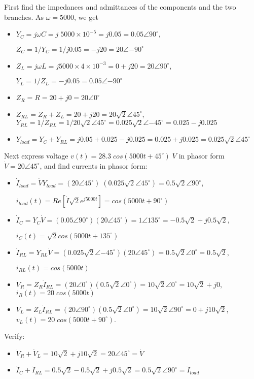 First find the impedances and admittances of the components and the two
branches. As $\omega=5000$, we get
\begin{itemize}
\item $Y_C=j\omega C=j\;5000\times 10^{-5}=j0.05=0.05\angle{90^\circ}$,

	$Z_C=1/Y_C=1/j0.05=-j20=20\angle{-90^\circ}$
\item $Z_L=j\omega L=j5000\times 4\times 10^{-3}=0+j20=20\angle{90^\circ}$,

	$Y_L=1/Z_L=-j0.05=0.05\angle{-90^\circ}$
\item $Z_R=R=20+j0=20\angle{0^\circ}$

\item $Z_{RL}=Z_R+Z_L=20+j20=20\sqrt{2}\angle{45^\circ}$,
	$Y_{RL}=1/Z_{RL}=1/20\sqrt{2}\angle{45^\circ}
	=0.025\sqrt{2}\angle{-45^\circ}=0.025-j0.025$

\item $Y_{load}=Y_C+Y_{RL}=j0.05+0.025-j0.025=0.025+j0.025
	=0.025\sqrt{2}\angle{45^\circ}$
\end{itemize}
Next express voltage $v(t)=28.3\;cos(5000t+45^\circ)\;V$ in phasor form
$\dot{V}=20\angle{45^\circ}$, and find currents in phasor form:
\begin{itemize}
\item $\dot{I}_{load}=\dot{V}Y_{load}=(20\angle{45^\circ})\;
	(0.025\sqrt{2}\angle{45^\circ})=0.5\sqrt{2}\angle{90^\circ}$,

	$i_{load}(t)=Re[\dot{I}\sqrt{2}e^{j5000t}]=cos(5000t+90^\circ)$
\item $\dot{I}_C=Y_C\dot{V}=(0.05\angle{90^\circ})(20\angle{45^\circ})
	=1\angle{135^\circ}=-0.5\sqrt{2}+j0.5\sqrt{2}$,

	$i_C(t)=\sqrt{2}cos(5000t+135^\circ)$
\item $\dot{I}_{RL}=Y_{RL}\dot{V}=(0.025\sqrt{2}\angle{-45^\circ})(20\angle{45^\circ})
	=0.5\sqrt{2}\angle{0^\circ}=0.5\sqrt{2}$,

	$i_{RL}(t)=cos(5000t)$
\item $\dot{V}_R=Z_R\dot{I}_{RL}=(20\angle{0^\circ})(0.5\sqrt{2}\angle{0^\circ})
	=10\sqrt{2}\angle{0^\circ}=10\sqrt{2}+j0$,
	$i_R(t)=20\;cos(5000t)$
\item $\dot{V}_L=Z_L\dot{I}_{RL}=(20\angle{90^\circ})(0.5\sqrt{2}\angle{0^\circ})
	=10\sqrt{2}\angle{90^\circ}=0+j10\sqrt{2}$,
	$v_L(t)=20\;cos(5000t+90^\circ)$.
\end{itemize}
Verify: 
\begin{itemize}
\item $\dot{V}_R+\dot{V}_L=10\sqrt{2}+j10\sqrt{2}=20\angle{45^\circ}
	=\dot{V}$
\item $\dot{I}_C+\dot{I}_{RL}=0.5\sqrt{2}-0.5\sqrt{2}+j0.5\sqrt{2}
	=0.5\sqrt{2}\angle{90^\circ}=\dot{I}_{load}$
\end{itemize}

